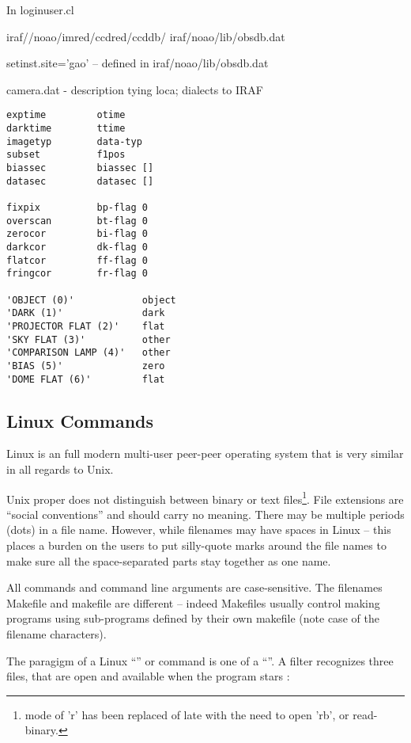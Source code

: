 In loginuser.cl

iraf//noao/imred/ccdred/ccddb/
iraf/noao/lib/obsdb.dat

setinst.site='gao' -- defined in iraf/noao/lib/obsdb.dat

camera.dat - description tying loca; dialects to IRAF

\begingroup \fontsize{10pt}{10pt}
\selectfont
\begin{verbatim} 
exptime         otime
darktime        ttime
imagetyp        data-typ
subset          f1pos
biassec         biassec []
datasec         datasec []

fixpix          bp-flag 0
overscan        bt-flag 0
zerocor         bi-flag 0
darkcor         dk-flag 0
flatcor         ff-flag 0
fringcor        fr-flag 0

'OBJECT (0)'            object
'DARK (1)'              dark
'PROJECTOR FLAT (2)'    flat
'SKY FLAT (3)'          other
'COMPARISON LAMP (4)'   other
'BIAS (5)'              zero
'DOME FLAT (6)'         flat
\end{verbatim}
\endgroup

\subsection{Linux Commands}

Linux is an full modern multi-user peer-peer operating system that is very
similar in all regards to Unix.

Unix proper does not distinguish between binary or text files\footnote{mode
of 'r' has been replaced of late with the need to open 'rb', or read-binary.}.
File extensions are ``social conventions'' and should carry no meaning.
There may be multiple periods (dots) in a file name. However, while 
filenames may have spaces in Linux -- this places a burden on the
users to put silly-quote marks around the file names to make sure
all the space-separated parts stay together as one name.

All commands and command line arguments are case-sensitive. The filenames
Makefile and makefile are different -- indeed Makefiles usually control
making programs using sub-programs defined by their own makefile (note
case of the filename characters).


The paragigm of a Linux ``'' or command is one of a
``''. A filter recognizes three files, that are 
open and available when the program stars : 

